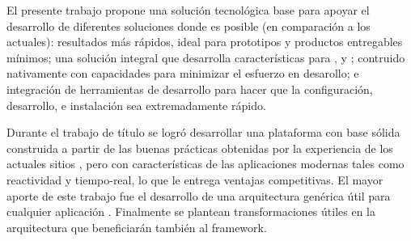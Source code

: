 El presente trabajo propone una solución tecnológica base para apoyar el desarrollo de diferentes soluciones \ecommerceCOM donde es posible (en comparación a los \frameworksPC actuales):  resultados más rápidos, ideal para prototipos y productos entregables mínimos; una solución integral que desarrolla características para \serversAS, \browsersINT y \devicesINT \mobilesINT; contruido nativamente con capacidades \realTimeINT para minimizar el esfuerzo en desarollo; e integración de herramientas de desarrollo para hacer que la configuración, desarrollo, e instalación sea extremadamente rápido.


Durante el trabajo de título se logró desarrollar una plataforma con base sólida construida a partir de las buenas prácticas obtenidas por la experiencia de los actuales sitios \webINT \ecommerceCOM, pero con características de las aplicaciones \webINT modernas tales como reactividad y tiempo-real, lo que le entrega ventajas competitivas.  El mayor aporte de este trabajo fue el desarrollo de una arquitectura genérica útil para cualquier aplicación \webINT. Finalmente se plantean transformaciones útiles en la arquitectura que beneficiarán también al framework.




